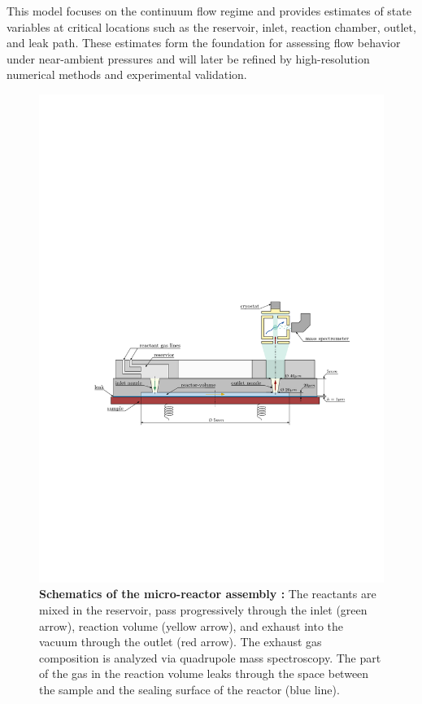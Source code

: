 	This model focuses on the continuum flow regime and provides estimates of state variables at critical locations such as the reservoir, inlet, reaction chamber, outlet, and leak path.  
	These estimates form the foundation for assessing flow behavior under near-ambient pressures and will later be refined by high-resolution numerical methods and experimental validation.
	\begin{figure}[H]
	    \centering
	    \includegraphics[width=\textwidth]{src/01_scope-and-objectives/fig_technical-drawing.pdf}
	    \caption[Schematics of the micro-reactor assembly \cite{lagin2025poster}:]{
			\textbf{Schematics of the micro-reactor assembly \cite{lagin2025poster}:} The reactants are mixed in the reservoir, pass progressively through the inlet (green arrow), reaction volume (yellow arrow), and exhaust into the vacuum through the outlet (red arrow).
			The exhaust gas composition is analyzed via quadrupole mass spectroscopy.
			The part of the gas in the reaction volume leaks through the space between the sample and the sealing surface of the reactor (blue line).
			}
	    \label{fig:technical-drawing}
	\end{figure}

